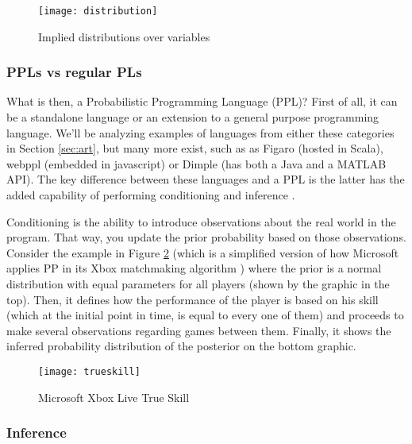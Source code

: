 \begin{itemsize}
\begin{figure}[t]
  \begin{center}
    \leavevmode
    \texttt{[image: distribution]}
    \caption{Implied distributions over variables \cite{intpp}}
    \label{fig:distribution}
  \end{center}
\end{figure}

\subsubsection{PPLs vs regular PLs}

What is then, a Probabilistic Programming Language (PPL)? First of all, it can
be a standalone language or an extension to a general purpose programming language.
We'll be analyzing examples of languages from either these categories in Section
\ref{sec:art}, but many more exist, such as as Figaro \cite{figaro} (hosted in Scala),
webppl \cite{dippl} (embedded in javascript) or Dimple
\cite{DBLP:journals/corr/abs-1212-2991} (has both a Java and a MATLAB API).
The key difference between these languages and a PPL is the latter has
the added capability of performing conditioning and inference \cite{Andrieu2003}.

Conditioning is the ability to introduce observations about the real world in
the program. That way, you update the prior probability based
on those observations. Consider the example in Figure \ref{fig:truskill} (which
is a simplified version of how Microsoft applies PP in its Xbox matchmaking
algorithm \cite{minka2012infer}) where the prior is a normal distribution with
equal parameters for all players (shown by the graphic in the top). Then, it
defines how the performance of the player is based on his skill (which at the initial
point in time, is equal to every one of them) and proceeds to make several
observations regarding games between them. Finally, it shows the inferred
probability distribution of the posterior on the bottom graphic.

\begin{figure}[t]
  \begin{center}
    \leavevmode
    \texttt{[image: trueskill]}
    \caption{Microsoft Xbox Live True Skill \cite{minka2012infer}}
    \label{fig:truskill}
  \end{center}
\end{figure}

\subsubsection{Inference}


\end{itemsize}
